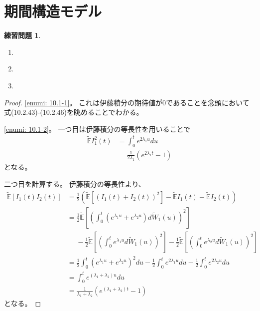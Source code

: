 \documentclass[uplatex]{jsarticle}
\theoremstyle{definition}
\newtheorem{prob}[prob]{練習問題}
\def\E{\mathbb{E}}
\begin{document}
\newpage

\section{期間構造モデル}\label{section: 10}



\begin{prob}\label{prob: 10.1}
  \begin{enumerate}
    \item \label{enumi: 10.1-1}
    \item \label{enumi: 10.1-2}
    \item \label{enumi: 10.1-3}
  \end{enumerate}
\end{prob}

\begin{proof}
  \ref{enumi: 10.1-1}。
  これは伊藤積分の期待値が\(0\)であることを念頭において
  式(10.2.43)-(10.2.46)を眺めることでわかる。

  \ref{enumi: 10.1-2}。
  一つ目は伊藤積分の等長性を用いることで
  \begin{align*}
    \tilde{\E}I_1^2(t)
    &= \int_0^te^{2\lambda_1u}du \\
    &= \frac{1}{2\lambda_1}\left( e^{2\lambda_1t} - 1 \right)
  \end{align*}
  となる。

  二つ目を計算する。
  伊藤積分の等長性より、
  \begin{align*}
    \tilde{\E}\left[ I_1(t)I_2(t) \right]
    &= \frac{1}{2}\left( \tilde{\E}\left[ \left( I_1(t)+I_2(t) \right)^2 \right]
    - \tilde{\E}I_1(t) - \tilde{\E}I_2(t) \right) \\
    &= \frac{1}{2}\tilde{\E}\left[ \left(
    \int_0^t\left(e^{\lambda_1u}+e^{\lambda_2u}\right)
    d\tilde{W}_1(u)\right)^2\right] \\
    &\ \ \ \ \ \
    - \frac{1}{2}\tilde{\E}\left[ \left( \int_0^t e^{\lambda_1u}
    d\tilde{W}_1(u)\right)^2\right]
    - \frac{1}{2}\tilde{\E}\left[ \left( \int_0^t e^{\lambda_2u}
    d\tilde{W}_1(u)\right)^2\right]  \\
    &= \frac{1}{2}
    \int_0^t\left(e^{\lambda_1u}+e^{\lambda_2u}\right)^2 du
    - \frac{1}{2}\int_0^t e^{2\lambda_1u} du
    - \frac{1}{2}\int_0^t e^{2\lambda_2u} du \\
    &= \int_0^t e^{(\lambda_1 + \lambda_2)u} du \\
    &= \frac{1}{\lambda_1+\lambda_2}\left( e^{(\lambda_1+\lambda_2)t}-1\right)
  \end{align*}
  となる。


\end{proof}
\end{document}
